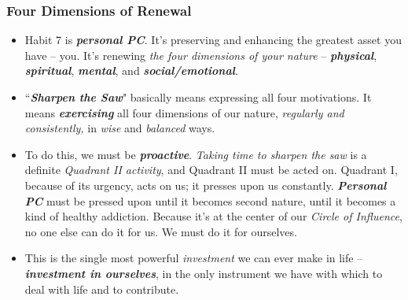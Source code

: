 \documentclass[11pt]{article}
\begin{document}
\subsubsection{Four Dimensions of Renewal}
\begin{itemize}
\item Habit 7 is \emph{\textbf{personal PC}}. It's preserving and enhancing the greatest asset you have -- you. It's renewing \emph{the four dimensions of your nature} -- \emph{\textbf{physical}}, \emph{\textbf{spiritual}}, \emph{\textbf{mental}}, and \textbf{\emph{social/emotional}}.

\item ``\emph{\textbf{Sharpen the Saw}}" basically means expressing all four motivations. It means \emph{\textbf{exercising}} all four dimensions of our nature, \emph{regularly and consistently,} in \emph{wise} and \emph{balanced} ways.

\item To do this, we must be \emph{\textbf{proactive}}. \emph{Taking time to sharpen the saw} is a definite \emph{Quadrant II activity}, and Quadrant II must be acted on. Quadrant I, because of its urgency, acts on us; it presses upon us constantly. \emph{\textbf{Personal PC}} must be pressed upon until it becomes second nature, until it becomes a kind of healthy addiction. Because it's at the center of our \emph{Circle of Influence}, no one else can do it for us. We must do it for ourselves.

\item This is the single most powerful \emph{investment} we can ever make in life -- \emph{\textbf{investment in ourselves}}, in the only instrument we have with which to deal with life and to contribute. 
\end{itemize}
\end{document}
